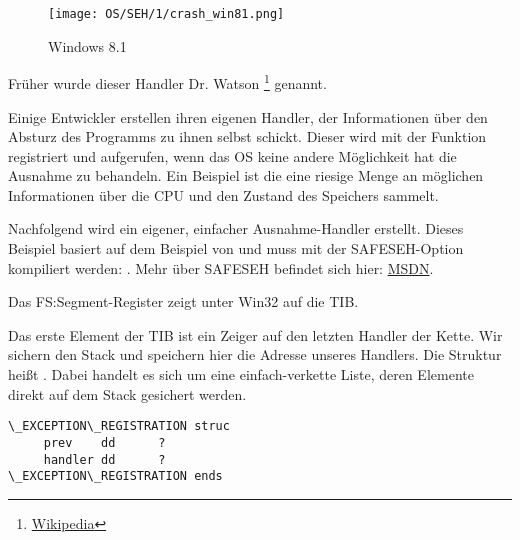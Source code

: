 \begin{figure}[H]
\centering
\texttt{[image: OS/SEH/1/crash\_win81.png]}
\caption{Windows 8.1}
\end{figure}

Früher wurde dieser Handler Dr. Watson
\footnote{\href{http://go.yurichev.com/17046}{Wikipedia}}
genannt.

Einige Entwickler erstellen ihren eigenen Handler, der Informationen über den Absturz
des Programms zu ihnen selbst schickt.
Dieser wird mit der Funktion  registriert und aufgerufen,
wenn das \ac{OS} keine andere Möglichkeit hat die Ausnahme zu behandeln.
\myindex{\oracle}
Ein Beispiel ist \oracle die eine riesige Menge an möglichen Informationen über die \ac{CPU}
und den Zustand des Speichers sammelt.

Nachfolgend wird ein eigener, einfacher Ausnahme-Handler erstellt.
Dieses Beispiel basiert auf dem Beispiel von \PietrekSEH und muss mit der SAFESEH-Option
kompiliert werden: .
Mehr über SAFESEH befindet sich hier: \href{http://go.yurichev.com/17252}{MSDN}.



Das FS:Segment-Register zeigt unter Win32 auf die \ac{TIB}.

Das erste Element der \ac{TIB} ist ein Zeiger auf den letzten Handler der Kette.
Wir sichern den Stack und speichern hier die Adresse unseres Handlers.
Die Struktur heißt . Dabei handelt es sich um eine
einfach-verkette Liste, deren Elemente direkt auf dem Stack gesichert werden.

\begin{lstlisting}[caption=MSVC/VC/crt/src/exsup.inc,style=customasmx86]
\_EXCEPTION\_REGISTRATION struc
     prev    dd      ?
     handler dd      ?
\_EXCEPTION\_REGISTRATION ends
\end{lstlisting}

